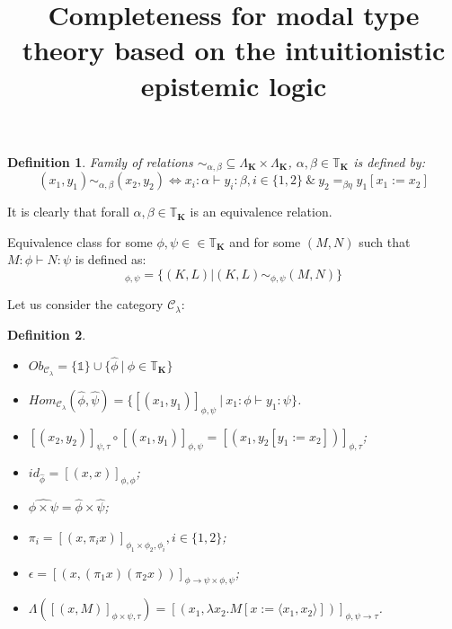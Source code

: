 \documentclass[a4paper]{article}
\date{}
\title{Completeness for modal type theory based on the intuitionistic epistemic logic}
\newtheorem{defin}{Definition}
\begin{document}
\maketitle

\begin{defin} Family of relations $\sim_{\alpha, \beta} \subseteq \Lambda_{\textbf{K}} \times \Lambda_{\textbf{K}}$, $\alpha, \beta \in \mathbb{T}_{\textbf{K}}$ is defined by:
\begin{equation}
(x_1, y_1) \sim_{\alpha, \beta} (x_2, y_2) \Leftrightarrow x_i : \alpha \vdash y_i : \beta, i \in \{ 1,2 \} \: \& \: y_2 =_{\beta\eta} y_1 [x_1 := x_2]
\end{equation}
\end{defin}

It is clearly that forall $\alpha, \beta \in \mathbb{T}_{\textbf{K}}$ is an equivalence relation.

Equivalence class for some $\phi, \psi \in \in \mathbb{T}_{\textbf{K}}$ and for some $(M, N)$ such that $M :
\phi \vdash N : \psi$ is defined as:
\begin{equation}
[(M,N)]_{\phi, \psi} = \{ (K, L) | (K, L) \sim_{\phi, \psi} (M, N)\}
\end{equation}

\vspace{\baselineskip}

Let us consider the category $\mathcal{C}_{\lambda}$:
\begin{defin}

$ $

\begin{itemize}
\item $Ob_{\mathcal{C}_{\lambda}} = \{ \mathds{1}\} \cup \{ \hat{\phi} \: | \: \phi \in
\mathbb{T}_{\textbf{K}} \}$
\item $Hom_{\mathcal{C}_{\lambda}}(\hat{\phi},\hat{\psi}) = \{ [(x_1, y_1)]_{\phi, \psi} \: | \: x_1 : \phi
\vdash y_1 : \psi \}$.
\item $[(x_2, y_2)]_{\psi, \tau} \circ [(x_1, y_1)]_{\phi, \psi} = [(x_1, y_2[y_1 := x_2])]_{\phi, \tau}$;
\item $id_{\hat{\phi}} = [(x,x)]_{\phi, \phi}$;
\item $\widehat{\phi \times \psi} = \hat{\phi} \times \hat{\psi}$;
\item $\pi_i = [(x, \pi_i x)]_{\phi_1 \times \phi_2, \phi_i}, i \in \{ 1, 2\}$;
\item $\epsilon = [(x, (\pi_1 x)(\pi_2 x))]_{\phi \rightarrow \psi \times \phi, \psi}$;
\item $\Lambda([(x, M)]_{\phi \times \psi, \tau}) = [(x_1, \lambda x_2. M [x := \langle x_1, x_2
\rangle])]_{\phi, \psi \rightarrow \tau}$.
\end{itemize}
\end{defin}
\end{document}
